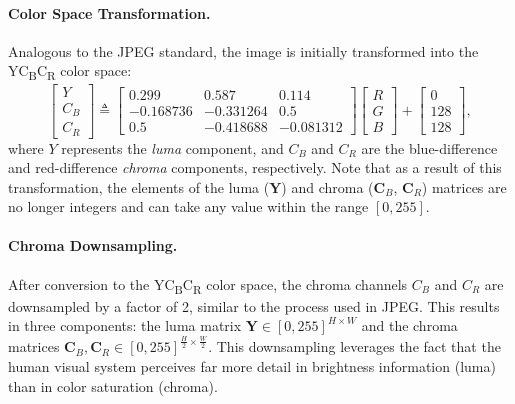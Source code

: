 \paragraph{Color Space Transformation.}
Analogous to the JPEG standard, the image is initially transformed into the YC\textsubscript{B}C\textsubscript{R} color space:
\begin{equation} \label{eq: ycbcr transform}
	\begin{bmatrix}
		Y \\
		C_B \\
		C_R
	\end{bmatrix} \triangleq
	\begin{bmatrix}
		0.299 & 0.587 & 0.114 \\
		-0.168736 & -0.331264 & 0.5 \\
		0.5 & -0.418688 & -0.081312
	\end{bmatrix}
	\begin{bmatrix}
		R \\
		G \\
		B
	\end{bmatrix}
	+
	\begin{bmatrix}
		0 \\
		128 \\
		128
	\end{bmatrix},
\end{equation}
where $Y$ represents the \emph{luma} component, and $C_B$ and $C_R$ are the blue-difference and red-difference \emph{chroma} components, respectively.  Note that as a result of this transformation, the elements of the luma ($\bm{Y}$) and chroma ($\bm{C}_B$, $\bm{C}_R$) matrices are no longer integers and can take any value within the range $[0, 255]$.

\paragraph{Chroma Downsampling.} 
After conversion to the YC\textsubscript{B}C\textsubscript{R} color space, the chroma channels $C_B$ and $C_R$ are downsampled by a factor of 2, similar to the process used in JPEG. This results in three components: the luma matrix $\bm{Y} \in [0, 255]^{H \times W}$ and the chroma matrices $\bm{C}_B, \bm{C}_R \in [0, 255]^{\frac{H}{2} \times \frac{W}{2}}$. This downsampling leverages the fact that the human visual system perceives far more detail in brightness information (luma) than in color saturation (chroma).

